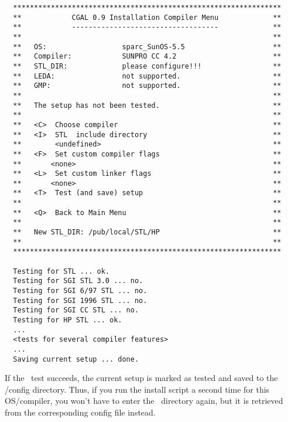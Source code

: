 \begin{scriptsize}
\begin{verbatim}
  ****************************************************************
  **            CGAL 0.9 Installation Compiler Menu             **
  **            -----------------------------------             **
  **                                                            **
  **   OS:                  sparc_SunOS-5.5                     **
  **   Compiler:            SUNPRO CC 4.2                       **
  **   STL_DIR:             please configure!!!                 **
  **   LEDA:                not supported.                      **
  **   GMP:                 not supported.                      **
  **                                                            **
  **   The setup has not been tested.                           **
  **                                                            **
  **   <C>  Choose compiler                                     **
  **   <I>  STL  include directory                              **
  **        <undefined>                                         **
  **   <F>  Set custom compiler flags                           **
  **       <none>                                               **
  **   <L>  Set custom linker flags                             **
  **       <none>                                               **
  **   <T>  Test (and save) setup                               **
  **                                                            **
  **   <Q>  Back to Main Menu                                   **
  **                                                            **
  **   New STL_DIR: /pub/local/STL/HP                           **
  **                                                            **
  ****************************************************************

  Testing for STL ... ok.
  Testing for SGI STL 3.0 ... no.
  Testing for SGI 6/97 STL ... no.
  Testing for SGI 1996 STL ... no.
  Testing for SGI CC STL ... no.
  Testing for HP STL ... ok.
  ...
  <tests for several compiler features>
  ...
  Saving current setup ... done.
\end{verbatim}
\end{scriptsize}

If the \stl\ test succeeds, the current setup is marked as tested and
saved to the \cgaldir/config directory. Thus, if you run the install
script a second time for this OS/compiler, you won't have to enter the
\stl\ directory again, but it is retrieved from the corresponding
config file instead.

